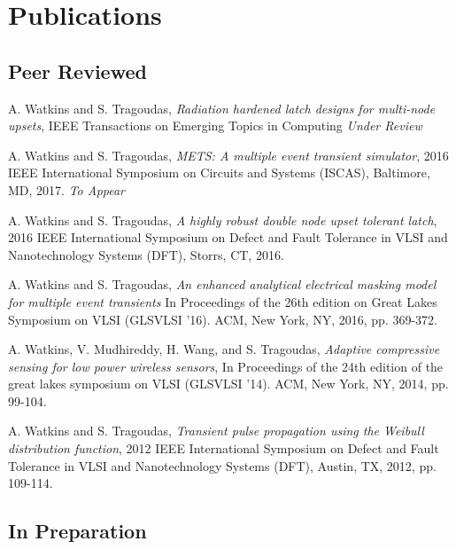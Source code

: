 \documentclass[letterpaper]{article}
\renewenvironment{itemize}{
  \begin{list}{}{
    \setlength{\leftmargin}{1.5em}
  }
}{
  \end{list}
}
\begin{document}
\section*{Publications}

\subsection*{Peer Reviewed}

\begin{itemize}

\item A. Watkins and S. Tragoudas, \emph{Radiation hardened latch designs for multi-node upsets}, IEEE Transactions on Emerging Topics in Computing \emph{Under Review}

\item A. Watkins and S. Tragoudas, \emph{METS: A multiple event transient simulator}, 2016 IEEE International Symposium on Circuits and Systems (ISCAS), Baltimore, MD, 2017. \emph{To Appear}
	
\item A. Watkins and S. Tragoudas, \emph{A highly robust double node upset tolerant latch}, 2016 IEEE International Symposium on Defect and Fault Tolerance in VLSI and Nanotechnology Systems (DFT), Storrs, CT, 2016.
	
\item A. Watkins and S. Tragoudas, \emph{An enhanced analytical electrical masking model for multiple event transients} In Proceedings of the 26th edition on Great Lakes Symposium on VLSI (GLSVLSI '16). ACM, New York, NY, 2016, pp. 369-372.
	
\item A. Watkins, V. Mudhireddy, H. Wang, and S. Tragoudas, \emph{Adaptive compressive sensing for low power wireless sensors}, In Proceedings of the 24th edition of the great lakes symposium on VLSI (GLSVLSI '14). ACM, New York, NY, 2014, pp. 99-104.

\item A. Watkins and S. Tragoudas, \emph{Transient pulse propagation using the Weibull distribution function}, 2012 IEEE International Symposium on Defect and Fault Tolerance in VLSI and Nanotechnology Systems (DFT), Austin, TX, 2012, pp. 109-114.
\end{itemize}

\subsection*{In Preparation}
\end{document}
